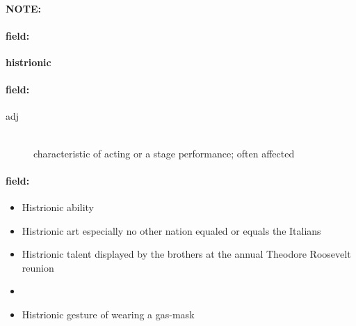 \documentclass[12pt]{article}
\newenvironment{note}{\paragraph{NOTE:}}{}
\newenvironment{field}{\paragraph{field:}}{}
\begin{document}
\begin{note}
\begin{field}
\textbf{\large histrionic}
\end{field}


\begin{field}
\begin{description}
\item[adj] \hfill \\ 
characteristic of acting or a stage performance; often affected

\end{description}
\end{field}

\begin{field}
\begin{itemize}
\item Histrionic ability
\item Histrionic art especially no other nation equaled or equals the Italians
\item Histrionic talent displayed by the brothers at the annual Theodore Roosevelt reunion
\item 
\item Histrionic gesture of wearing a gas-mask
\end{itemize}
\end{field}
\end{note}
\end{document}
